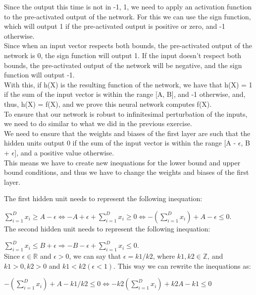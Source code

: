 \documentclass{article}
\begin{document}
Since the output this time is not in {-1, 1}, we need to apply an activation function to the pre-activated output of the network. For this we can use
the sign function, which will output 1 if the pre-activated output is positive or zero, and -1 otherwise. \\
Since when an input vector respects both bounds, the pre-activated output of the network is 0, the sign function will output 1. If the input doesn't
respect both bounds, the pre-activated output of the network will be negative, and the sign function will output -1. \\

With this, if h(X) is the resulting function of the network, we have that h(X) = 1 if the sum of the input vector is within the range [A, B], 
and -1 otherwise, and, thus, h(X) = f(X), and we prove this neural network computes f(X). \\

To ensure that our network is robust to infinitesimal perturbation of the inputs, we need to do similar to what we did in the previous exercise. \\

We need to ensure that the weights and biases of the first layer are such that the hidden units output 0 if the sum of the input vector is 
within the range [A - $\epsilon$, B + $\epsilon$], and a positive value otherwise. \\

This means we have to create new inequations for the lower bound and upper bound conditions, 
and thus we have to change the weights and biases of the first layer.

The first hidden unit needs to represent the following inequation:

$ \sum_{i=1}^{D} x_i \geq A - \epsilon \iff -A + \epsilon + \sum_{i=1}^{D} x_i \geq 0 
\iff -(\sum_{i=1}^{D} x_i) + A - \epsilon \leq 0$. \\

The second hidden unit needs to represent the following inequation:

$ \sum_{i=1}^{D} x_i \leq B + \epsilon \Rightarrow -B - \epsilon + \sum_{i=1}^{D} x_i \leq 0$. \\

Since $\epsilon \in \mathbb{R}$ and $\epsilon > 0$, we can say that $\epsilon = k1/k2$, where $k1, k2 \in \mathbb{Z}$, and $k1 > 0, k2 > 0$ and $k1 < k2
(\epsilon < 1)$.
This way we can rewrite the inequations as:

$ -(\sum_{i=1}^{D} x_i) + A - k1/k2 \leq 0 \iff -k2(\sum_{i=1}^{D} x_i) + k2A - k1 \leq 0$
\end{document}
